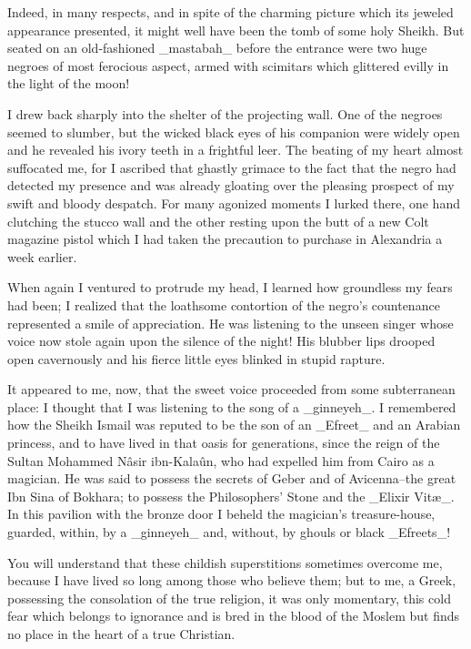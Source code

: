 Indeed, in many respects, and in spite of the charming picture which
its jeweled appearance presented, it might well have been the tomb of
some holy Sheikh. But seated on an old-fashioned _mastabah_ before
the entrance were two huge negroes of most ferocious aspect, armed
with scimitars which glittered evilly in the light of the moon!

I drew back sharply into the shelter of the projecting wall. One of
the negroes seemed to slumber, but the wicked black eyes of his
companion were widely open and he revealed his ivory teeth in a
frightful leer. The beating of my heart almost suffocated me, for I
ascribed that ghastly grimace to the fact that the negro had detected
my presence and was already gloating over the pleasing prospect of my
swift and bloody despatch. For many agonized moments I lurked there,
one hand clutching the stucco wall and the other resting upon the butt
of a new Colt magazine pistol which I had taken the precaution to
purchase in Alexandria a week earlier.

When again I ventured to protrude my head, I learned how groundless
my fears had been; I realized that the loathsome contortion of the
negro's countenance represented a smile of appreciation. He was
listening to the unseen singer whose voice now stole again upon the
silence of the night! His blubber lips drooped open cavernously and
his fierce little eyes blinked in stupid rapture.

It appeared to me, now, that the sweet voice proceeded from some
subterranean place: I thought that I was listening to the song of a
_ginneyeh_. I remembered how the Sheikh Ismail was reputed to be the
son of an _Efreet_ and an Arabian princess, and to have lived in that
oasis for generations, since the reign of the Sultan Mohammed Nâsir
ibn-Kalaûn, who had expelled him from Cairo as a magician. He was said
to possess the secrets of Geber and of Avicenna--the great Ibn Sina of
Bokhara; to possess the Philosophers' Stone and the _Elixir Vitæ_. In
this pavilion with the bronze door I beheld the magician's
treasure-house, guarded, within, by a _ginneyeh_ and, without, by
ghouls or black _Efreets_!

You will understand that these childish superstitions sometimes
overcome me, because I have lived so long among those who believe
them; but to me, a Greek, possessing the consolation of the true
religion, it was only momentary, this cold fear which belongs to
ignorance and is bred in the blood of the Moslem but finds no place
in the heart of a true Christian.

